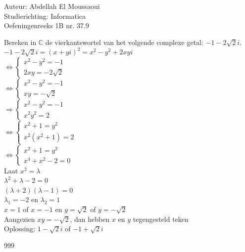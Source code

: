 \documentclass[a4paper]{article}
\begin{document}
  
\noindent \large Auteur: Abdellah El Moussaoui \\
\noindent \large Studierichting: Informatica\\
\noindent \large Oefeningenreeks 1B nr. 37.9\\

\medskip

\normalsize

Bereken in $\mathbb{C}$ de vierkantswortel van het volgende complexe getal: $ -1 - 2\sqrt{2}i $.\\

$ -1 - 2\sqrt{2}i = (x + yi)^2 = x^2 - y^2 + 2xyi $\\

$\Leftrightarrow \left \{
\begin{array}{l}
    x^2 - y^2 = -1 \\
    2xy = -2\sqrt{2}
\end{array}
\right .$\\

$\Leftrightarrow \left \{
\begin{array}{l}
    x^2 - y^2 = -1 \\
    xy = -\sqrt{2}
\end{array}
\right .$\\

$\Rightarrow \left \{
\begin{array}{l}
    x^2 - y^2 = -1 \\
    x^2y^2 = 2
\end{array}
\right .$\\

$\Leftrightarrow \left \{
\begin{array}{l}
    x^2 +1 = y^2 \\
    x^2(x^2+1) = 2
\end{array}
\right .$\\

$\Leftrightarrow \left \{
\begin{array}{l}
    x^2 +1 = y^2 \\
    x^4 + x^2 - 2 = 0
\end{array}
\right .$\\

Laat $x^2=\lambda$\\

$ \lambda^2 + \lambda - 2 = 0 $\\

$ (\lambda +2)(\lambda-1)=0 $\\

$ \lambda_1 = -2 $ en $ \lambda_2 = 1 $\\

$ x = 1 $ of $x=-1$ en $ y = \sqrt{2} $ of $y=-\sqrt{2}$\\

Aangezien $xy=-\sqrt{2}$, dan hebben $x$ en $y$ tegengesteld teken\\

Oplossing: $ 1 - \sqrt{2}i $ of $ -1 + \sqrt{2}i $

\begin{thebibliography}{999}
\end{thebibliography}
\end{document}

